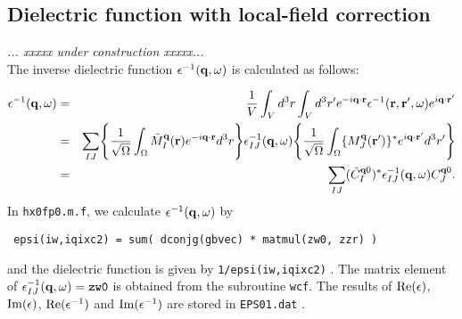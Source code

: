 \documentclass[a4paper,10pt,fleqn]{article}
\def\underconstruction{{\it... xxxxx under construction xxxxx...\\}}
\begin{document}
\subsection{Dielectric function with local-field correction}
\underconstruction
The inverse dielectric function $\epsilon^{-1}({\bf q},\omega)$ 
is calculated as follows:

\begin{eqnarray}
  \epsilon^{-1}({\bf q},\omega) 
 &=& \frac{1}{V}
  \int_V d^3r \int_V d^3r' e^{-i{\bf q}\cdot{\bf r}}
  \epsilon^{-1}({\bf r},{\bf r}',\omega)e^{i{\bf q}\cdot{\bf r}'} \nonumber \\
 &=&
  \sum_{IJ}
  \Biggr\{ \frac{1}{\sqrt{\Omega}} \int_{\Omega}  
  \tilde{M}_I^{\bf q}({\bf r})e^{-i{\bf q}\cdot{\bf r}}d^3r \Biggr\} 
  \epsilon_{IJ}^{-1}({\bf q}, \omega) 
  \Biggr\{ \frac{1}{\sqrt{\Omega}} \int_{\Omega}  
  \{ M_J^{\bf q}({\bf r}') \}^* e^{i{\bf q}\cdot{\bf r}'} d^3r' \Biggr\} 
  \nonumber \\
 &=& 
   \sum_{IJ} ( \tilde{C}^{{\bf q}0}_I )^* 
   \epsilon_{IJ}^{-1}({\bf q},\omega) C^{{\bf q}0}_J.
           \label{eq. epsi}
\end{eqnarray}
In \verb|hx0fp0.m.f|, we calculate $\epsilon^{-1}({\bf q},\omega)$ by
\begin{center}
 \verb| epsi(iw,iqixc2) = sum( dconjg(gbvec) * matmul(zw0, zzr) ) |
\end{center}
and the dielectric function is given by \verb|1/epsi(iw,iqixc2)| .
The matrix element of $\epsilon^{-1}_{IJ}({\bf q},\omega)=\verb|zw0|$
is obtained from the subroutine \verb|wcf|.
The results of ${\rm Re}(\epsilon)$, ${\rm Im}(\epsilon)$, 
${\rm Re}(\epsilon^{-1})$
and ${\rm Im}(\epsilon^{-1})$ are stored in \verb|EPS01.dat| .



\newpage
\end{document}
